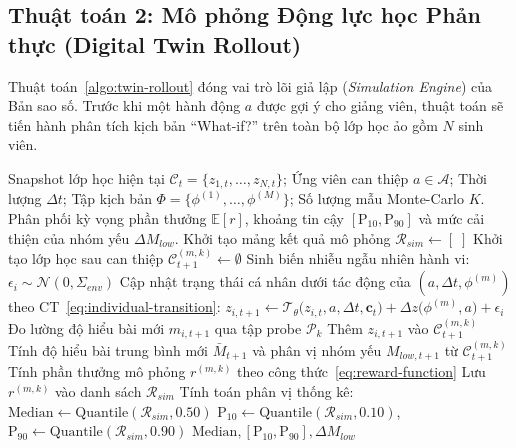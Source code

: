 \subsection{Thuật toán 2: Mô phỏng Động lực học Phản thực (Digital Twin Rollout)}\label{subsec:algo-twin-rollout}
Thuật toán~\ref{algo:twin-rollout} đóng vai trò lõi giả lập (\textit{Simulation Engine}) của Bản sao số. Trước khi một hành động $a$ được gợi ý cho giảng viên, thuật toán sẽ tiến hành phân tích kịch bản ``What-if?'' trên toàn bộ lớp học ảo gồm $N$ sinh viên.

\begin{algorithm}[H]
\caption{Mô phỏng Phản thực Lớp học (Counterfactual Digital Twin Rollout)}\label{algo:twin-rollout}
\begin{algorithmic}[1]
\Require Snapshot lớp học hiện tại $\mathcal{C}_t = \{z_{1,t}, \dots, z_{N,t}\}$; Ứng viên can thiệp $a \in \mathcal{A}$; Thời lượng $\Delta t$; Tập kịch bản $\Phi = \{\phi^{(1)}, \dots, \phi^{(M)}\}$; Số lượng mẫu Monte-Carlo $K$.
\Ensure Phân phối kỳ vọng phần thưởng $\mathbb{E}[r]$, khoảng tin cậy $[\text{P}_{10}, \text{P}_{90}]$ và mức cải thiện của nhóm yếu $\Delta M_{low}$.
\State Khởi tạo mảng kết quả mô phỏng $\mathcal{R}_{sim} \leftarrow [\;]$
        \State Khởi tạo lớp học sau can thiệp $\mathcal{C}_{t+1}^{(m, k)} \leftarrow \emptyset$
            \State Sinh biến nhiễu ngẫu nhiên hành vi: $\epsilon_i \sim \mathcal{N}(0, \Sigma_{env})$
            \State Cập nhật trạng thái cá nhân dưới tác động của $(a, \Delta t, \phi^{(m)})$ theo CT~\eqref{eq:individual-transition}:
            \State $z_{i, t+1} \leftarrow \mathcal{T}_{\theta}\big(z_{i, t}, a, \Delta t, \mathbf{c}_t\big) + \Delta z\big(\phi^{(m)}, a\big) + \epsilon_i$
            \State Đo lường độ hiểu bài mới $m_{i, t+1}$ qua tập probe $\mathcal{P}_k$
            \State Thêm $z_{i, t+1}$ vào $\mathcal{C}_{t+1}^{(m, k)}$
        \EndFor
        \State Tính độ hiểu bài trung bình mới $\bar{M}_{t+1}$ và phân vị nhóm yếu $M_{low, t+1}$ từ $\mathcal{C}_{t+1}^{(m, k)}$
        \State Tính phần thưởng mô phỏng $r^{(m, k)}$ theo công thức~\eqref{eq:reward-function}
        \State Lưu $r^{(m, k)}$ vào danh sách $\mathcal{R}_{sim}$
    \EndFor
\EndFor
\State Tính toán phân vị thống kê: $\text{Median} \leftarrow \text{Quantile}(\mathcal{R}_{sim}, 0.50)$
\State $\text{P}_{10} \leftarrow \text{Quantile}(\mathcal{R}_{sim}, 0.10)$, $\text{P}_{90} \leftarrow \text{Quantile}(\mathcal{R}_{sim}, 0.90)$
\State \Return $\text{Median}, [\text{P}_{10}, \text{P}_{90}], \Delta M_{low}$
\end{algorithmic}
\end{algorithm}

